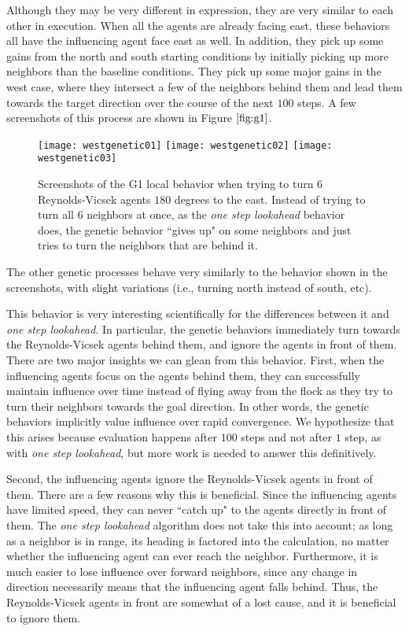 Although they may be very different in expression, they are very similar to each
other in execution.
When all the agents are already facing east, these behaviors all have the
influencing agent face east as well.
In addition, they pick up some gains from the north and south starting conditions
by initially picking up more neighbors than the baseline conditions.
They pick up some major gains in the west case, where they intersect a few of
the neighbors behind them and lead them towards the target direction over the
course of the next $100$ steps.
A few screenshots of this process are shown in Figure $\ref{fig:g1}$.
\begin{figure}
    \centering
    \texttt{[image: westgenetic01]}
    \texttt{[image: westgenetic02]}
    \texttt{[image: westgenetic03]}
    \caption{Screenshots of the G1 local behavior when trying to turn $6$
    Reynolds-Vicsek agents $180$ degrees to the east.
    Instead of trying to turn all $6$ neighbors at once, as the \textit{one step
    lookahead} behavior does, the genetic behavior ``gives up" on some neighbors
    and just tries to turn the neighbors that are behind it.}
    \label{fig:g1}
\end{figure}
The other genetic processes behave very similarly to the behavior shown in the
screenshots, with slight variations (i.e., turning north instead of south, etc).

This behavior is very interesting scientifically for the differences between it
and \textit{one step lookahead}.
In particular, the genetic behaviors immediately turn towards the Reynolds-Vicsek
agents behind them, and ignore the agents in front of them.
There are two major insights we can glean from this behavior.
First, when the influencing agents focus on the agents behind them, they can
successfully maintain influence over time instead of flying away from the flock
as they try to turn their neighbors towards the goal direction.
In other words, the genetic behaviors implicitly value influence over rapid
convergence.
We hypothesize that this arises because evaluation happens after $100$ steps and
not after $1$ step, as with \textit{one step lookahead}, but more work is
needed to answer this definitively.

Second, the influencing agents ignore the Reynolds-Vicsek agents in front of
them.
There are a few reasons why this is beneficial.
Since the influencing agents have limited speed, they can never ``catch
up" to the agents directly in front of them.
The \textit{one step lookahead} algorithm does not take this into account;
as long as a neighbor is in range, its heading is factored into the calculation,
no matter whether the influencing agent can ever reach the neighbor.
Furthermore, it is much easier to lose influence over forward neighbors, since
any change in direction necessarily means that the influencing agent falls
behind.
Thus, the Reynolds-Vicsek agents in front are somewhat of a lost cause, and it
is beneficial to ignore them.

